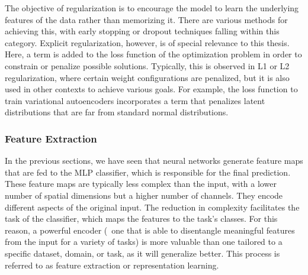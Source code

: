 The objective of regularization is to encourage the model to learn the underlying features of the data rather than memorizing it. There are various methods for achieving this, with early stopping or dropout techniques falling within this category. Explicit regularization, however, is of special relevance to this thesis. Here, a term is added to the loss function of the optimization problem in order to constrain or penalize possible solutions. Typically, this is observed in L1 or L2 regularization, where certain weight configurations are penalized, but it is also used in other contexts to achieve various goals. For example, the loss function to train variational autoencoders incorporates a term that penalizes latent distributions that are far from standard normal distributions.

\subsubsection{Feature Extraction}\label{subsubsec:feature_extraction}
In the previous sections, we have seen that neural networks generate feature maps that are fed to the MLP classifier, which is responsible for the final prediction. These feature maps are typically less complex than the input, with a lower number of spatial dimensions but a higher number of channels. They encode different aspects of the original input. The reduction in complexity facilitates the task of the classifier, which maps the features to the task's classes. For this reason, a powerful encoder (\ie~one that is able to disentangle meaningful features from the input for a variety of tasks) is more valuable than one tailored to a specific dataset, domain, or task, as it will generalize better. This process is referred to as feature extraction or representation learning.

